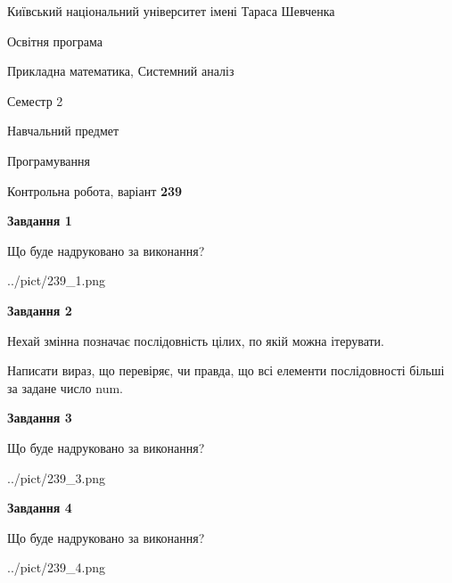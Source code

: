 \documentclass[12pt, ukrainian]{article}
\begin{document}
{{\begin {small}\par
{ \center  Київський національний університет імені Тараса Шевченка \par}
{\parbox {5 cm}{Освітня програма \hfill}{\parbox {8 cm}{Прикладна математика, Системний аналіз \hfill}}\parbox {5 cm}{\hfill Семестр 2}}\par
{\parbox {5 cm} {Навчальний предмет \hfill}\parbox {7 cm}{Програмування \hfill}\parbox {6cm}{\hfill}\par}\vspace{-7pt} \end{small}}{\center Контрольна робота, варіант  \No \textbf
{ 239 }\par}}
{
\begin {large}
{\begin {center}\textbf{Завдання 1}\end {center}}\par
Що буде надруковано за виконання?\par\par
\begin{center}
	{../pict/239_1.png}
\end{center}
\newpage

{\begin {center}\textbf{Завдання 2}\end {center}}\par
Нехай змінна  позначає послідовність цілих, по якій можна ітерувати.

Написати вираз, що перевіряє, чи правда, що всі елементи послідовності більші за задане число num.\par
\newpage

{\begin {center}\textbf{Завдання 3}\end {center}}\par
Що буде надруковано за виконання?
\begin{center}
	{../pict/239_3.png}
\end{center}
\newpage

{\begin {center}\textbf{Завдання 4}\end {center}}\par
Що буде надруковано за виконання?\par
\begin{center}
	{../pict/239_4.png}
\end{center}
\newpage


\end{large}}
\end{document}
